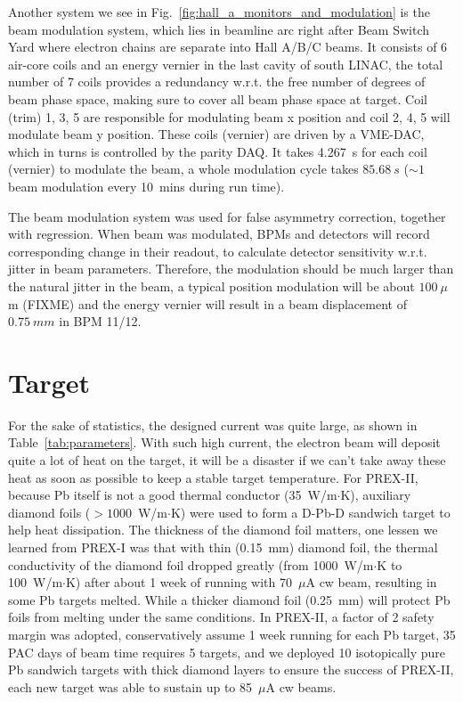 Another system we see in Fig.~\ref{fig:hall_a_monitors_and_modulation} is the
beam modulation system, which lies in beamline arc right after Beam Switch Yard 
where electron chains are separate into Hall A/B/C beams.
It consists of 6 air-core coils and an energy vernier in the last cavity of south LINAC, 
the total number of 7 coils provides a redundancy w.r.t. the free number of degrees 
of beam phase space, making sure to cover all beam phase space at target.  
Coil (trim) 1, 3, 5 are responsible for modulating beam x position and coil 
2, 4, 5 will modulate beam y position.
These coils (vernier) are driven by a VME-DAC, which in turns is controlled by the parity DAQ.
It takes 4.267~s for each coil (vernier) to modulate the beam, a whole 
modulation cycle takes $85.68 \ s$ ($\sim 1$ beam modulation every 10~mins during
run time). 

The beam modulation system was used for false asymmetry correction, together with
regression. When beam was modulated, BPMs and detectors will record corresponding
change in their readout, to calculate detector sensitivity w.r.t. jitter in beam
parameters. Therefore, the modulation should be much larger than the natural
jitter in the beam, a typical position modulation will be about $100\ \mu$m (FIXME)
and the energy vernier will result in a beam displacement of $0.75 \ mm$ in BPM 11/12.

\section{Target}
For the sake of statistics, the designed current was quite large, as shown in
Table~\ref{tab:parameters}. With such high current, the electron beam will deposit quite
a lot of heat on the target, it will be a disaster if we can't take away these
heat as soon as possible to keep a stable target temperature.
For PREX-II, because Pb itself is not a good thermal conductor (35~W/m$\cdot$K),
auxiliary diamond foils ($> 1000$~W/m$\cdot$K) were used to form a D-Pb-D sandwich target to help heat
dissipation. The thickness of the diamond foil matters, one lessen we learned 
from PREX-I was that with thin (0.15~mm) diamond foil, the thermal conductivity
of the diamond foil dropped greatly (from 1000~W/m$\cdot$K to 100~W/m$\cdot$K) after about 
1 week of running with 70~$\mu$A cw beam, resulting in some Pb targets melted. 
While a thicker diamond foil (0.25~mm) will protect Pb foils from melting 
under the same conditions. In PREX-II, a factor of 2 safety margin was
adopted, conservatively assume 1 week running for each Pb target, 35 PAC days of beam time
requires 5 targets, and we deployed 10 isotopically pure Pb sandwich targets with 
thick diamond layers to ensure the success of PREX-II, each new target was able
to sustain up to 85~$\mu$A cw beams.

